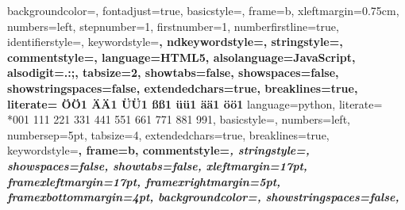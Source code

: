  {%
    backgroundcolor=\color{editorGray},
        fontadjust=true,
    basicstyle=\small\ttfamily,
    frame=b,
    xleftmargin={0.75cm},
    numbers=left,
    stepnumber=1,
    firstnumber=1,
    numberfirstline=true,
    identifierstyle=\color{black},
    keywordstyle=\color{blue}\bfseries,
    ndkeywordstyle=\color{editorGreen}\bfseries,
    stringstyle=\color{editorOcher}\ttfamily,
    commentstyle=\color{brown}\ttfamily,
    language=HTML5,
    alsolanguage=JavaScript,
    alsodigit={.:;},
    tabsize=2,
    showtabs=false,
    showspaces=false,
    showstringspaces=false,
    extendedchars=true,
    breaklines=true,
    literate=%
    {Ö}{{\"O}}1
    {Ä}{{\"A}}1
    {Ü}{{\"U}}1
    {ß}{{\ss}}1
    {ü}{{\"u}}1
    {ä}{{\"a}}1
    {ö}{{\"o}}1
}
 {%
    language=python,
    literate=%
    *{0}{{{\color{lightred}0}}}1
    {1}{{{\color{lightred}1}}}1
    {2}{{{\color{lightred}2}}}1
    {3}{{{\color{lightred}3}}}1
    {4}{{{\color{lightred}4}}}1
    {5}{{{\color{lightred}5}}}1
    {6}{{{\color{lightred}6}}}1
    {7}{{{\color{lightred}7}}}1
    {8}{{{\color{lightred}8}}}1
    {9}{{{\color{lightred}9}}}1,
    basicstyle=\small\ttfamily,
    numbers=left,
    numbersep=5pt,
    tabsize=4,
    extendedchars=true,
    breaklines=true,
    keywordstyle=\color{blue}\bfseries,
    frame=b,
    commentstyle=\color{brown}\itshape,
    stringstyle=\color{editorOcher}\ttfamily,
    showspaces=false,
    showtabs=false,
    xleftmargin=17pt,
    framexleftmargin=17pt,
    framexrightmargin=5pt,
    framexbottommargin=4pt,
    backgroundcolor=\color{lightgray},
    showstringspaces=false,
}
